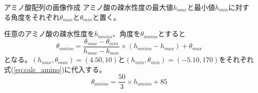 \documentclass[dvipdfmx]{beamer}
\begin{document}
  \begin{frame}{アミノ酸配列の画像作成}
    アミノ酸の疎水性度の最大値\(h_{max}\)と最小値\(h_{min}\)に対する角度をそれぞれ\(\theta_{max}\)と\(\theta_{min}\)と置く。
    \begin{figure}[H]
      \centering
    \end{figure}
  \end{frame}

  \begin{frame}
    任意のアミノ酸の疎水性度を\(h_{amino}\)、角度を\(\theta_{amino}\)とすると
    \begin{equation}
      \label{eq:calc_amino}
      \theta_{amino} = \frac{\theta_{max} - \theta_{min}}{h_{max} - h_{min}} \times (h_{amino} - h_{max}) + \theta_{max}
    \end{equation}
    となる。\((h_{max}, \theta_{max}) = (4.50, 10)\)と\((h_{min}, \theta_{min}) = (-5.10, 170)\)をそれぞれ式(\ref{eq:calc_amino})に代入する。
    \begin{equation}
      \label{eq:calc_amino_concreate}
      \theta_{amino} = \frac{50}{3} \times h_{amino} + 85
    \end{equation}
  \end{frame}
\end{document}
